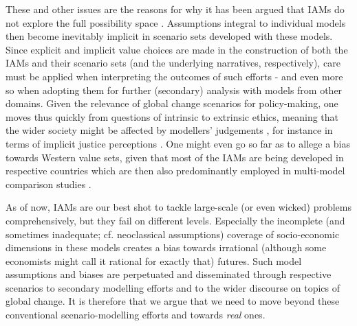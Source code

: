 \documentclass{article}
\begin{document}
\begin{refsection}


These and other issues are the reasons for why it has been argued that IAMs do not explore the full possibility space \parencite{keppo_2021,mccollum_2020, gambhir_2022}. Assumptions integral to individual models then become inevitably implicit in scenario sets developed with these models. Since explicit and implicit value choices are made in the construction of both the IAMs and their scenario sets (and the underlying narratives, respectively), care must be applied when interpreting the outcomes of such efforts \parencite[even if it is only reference scenarios; see e.g.][]{grant_2020} - and even more so when adopting them for further (secondary) analysis with models from other domains. Given the relevance of global change scenarios for policy-making, one moves thus quickly from questions of intrinsic to extrinsic ethics, meaning that the wider society might be affected by modellers' judgements \parencite{beck_2016},\footnotemark{} for instance in terms of implicit justice perceptions \parencite{rubiano_2022}. One might even go so far as to allege a bias towards Western value sets, given that most of the IAMs are being developed in respective countries which are then also predominantly employed in multi-model comparison studies \parencite{duan_2019}.


As of now, IAMs are our best shot to tackle large-scale (or even wicked) problems comprehensively, but they fail on different levels. Especially the incomplete (and sometimes inadequate; cf. neoclassical assumptions) coverage of socio-economic dimensions in these models creates a bias towards irrational (although some economists might call it rational for exactly that) futures. Such model assumptions and biases are perpetuated and disseminated through respective scenarios to secondary modelling efforts and to the wider discourse on topics of global change. It is therefore that we argue that we need to move beyond these conventional scenario-modelling efforts and towards \textit{real} ones.


\end{refsection}
\end{document}
